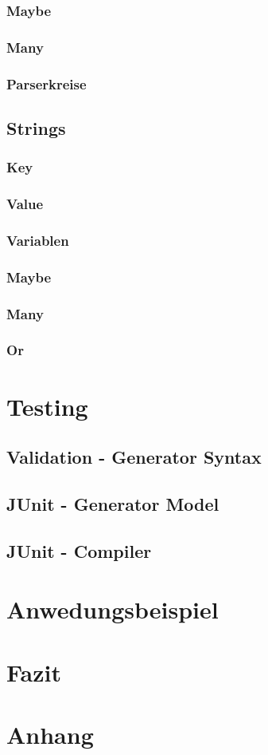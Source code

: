 \documentclass[a4paper,12pt,titlepage]{article}
\begin{document}
\subsubsection{Maybe}
\subsubsection{Many}
\subsubsection{Parserkreise}
\subsection{Strings}
\subsubsection{Key}
\subsubsection{Value}
\subsubsection{Variablen}
\subsubsection{Maybe}
\subsubsection{Many}
\subsubsection{Or}
\section{Testing}
\subsection{Validation - Generator Syntax}
\subsection{JUnit - Generator Model}
\subsection{JUnit - Compiler}
\section{Anwedungsbeispiel}
\section{Fazit}
\section{Anhang}
\end{document}
